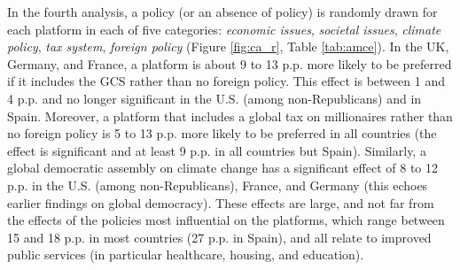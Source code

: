 In the fourth analysis, a policy (or an absence of policy) is randomly drawn for each platform in each of five categories: \textit{economic issues}, \textit{societal issues}, \textit{climate policy}, \textit{tax system}, \textit{foreign policy} (Figure \ref{fig:ca_r}, Table \ref{tab:amce}). 
In the UK, Germany, and France, a platform is about 9 to 13 p.p. more likely to be preferred if it includes the GCS rather than no foreign policy. %
This effect is between 1 and 4 p.p. and no longer significant in the U.S. (among non-Republicans) and in Spain. Moreover, a platform that includes a global tax on millionaires rather than no foreign policy is 5 to 13 p.p. more likely to be preferred in all countries (the effect is significant and at least 9 p.p. in all countries but Spain). 
Similarly, a global democratic assembly on climate change has a significant effect of 8 to 12 p.p. in the U.S. (among non-Republicans), France, and Germany (this echoes earlier findings on global democracy\citep{ghassim_who_2020}). 
These effects are large, and not far from the effects of the policies most influential on the platforms, which range between 15 and 18 p.p. in most countries (27 p.p. in Spain), and all relate to improved public services (in particular healthcare, housing, and education).
 
